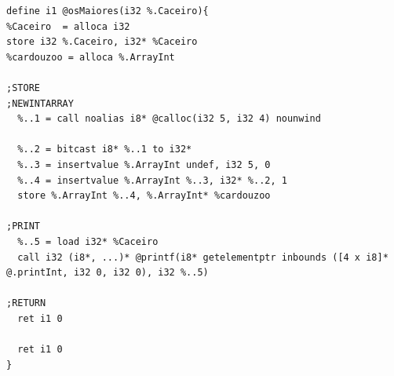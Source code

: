 \documentclass[12pt]{article}
\begin{document}
\begin{lstlisting}
define i1 @osMaiores(i32 %.Caceiro){
%Caceiro  = alloca i32
store i32 %.Caceiro, i32* %Caceiro 
%cardouzoo = alloca %.ArrayInt

;STORE
;NEWINTARRAY
  %..1 = call noalias i8* @calloc(i32 5, i32 4) nounwind

  %..2 = bitcast i8* %..1 to i32*
  %..3 = insertvalue %.ArrayInt undef, i32 5, 0
  %..4 = insertvalue %.ArrayInt %..3, i32* %..2, 1
  store %.ArrayInt %..4, %.ArrayInt* %cardouzoo

;PRINT
  %..5 = load i32* %Caceiro
  call i32 (i8*, ...)* @printf(i8* getelementptr inbounds ([4 x i8]* @.printInt, i32 0, i32 0), i32 %..5)

;RETURN
  ret i1 0

  ret i1 0
}


\end{lstlisting}
\end{document}
